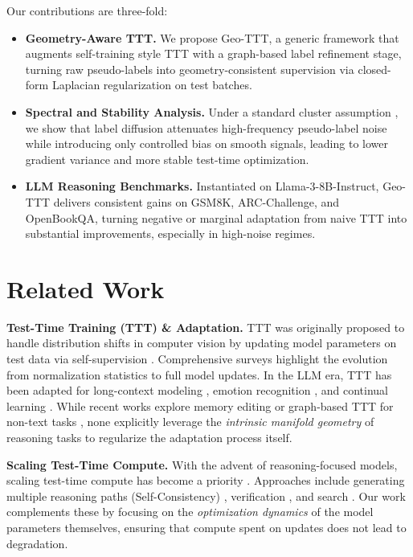 \documentclass{article}
\theoremstyle{plain}
\theoremstyle{definition}
\theoremstyle{remark}
\begin{document}
Our contributions are three-fold:
\begin{itemize}
    \item \textbf{Geometry-Aware TTT.} We propose Geo-TTT, a generic framework that augments self-training style TTT with a graph-based label refinement stage, turning raw pseudo-labels into geometry-consistent supervision via closed-form Laplacian regularization on test batches.
    \item \textbf{Spectral and Stability Analysis.} Under a standard cluster assumption \cite{chapelle2005manifold, belkin2006manifoldreg}, we show that label diffusion attenuates high-frequency pseudo-label noise while introducing only controlled bias on smooth signals, leading to lower gradient variance and more stable test-time optimization.
    \item \textbf{LLM Reasoning Benchmarks.} Instantiated on Llama-3-8B-Instruct, Geo-TTT delivers consistent gains on GSM8K, ARC-Challenge, and OpenBookQA, turning negative or marginal adaptation from naive TTT into substantial improvements, especially in high-noise regimes.
\end{itemize}


\section{Related Work}

\textbf{Test-Time Training (TTT) \& Adaptation.} 
TTT was originally proposed to handle distribution shifts in computer vision by updating model parameters on test data via self-supervision \cite{sun2020ttt, wang2021tent, mummadi2021tta}. Comprehensive surveys \cite{zhang2024surveytta, wang2023otta, xiao2024beyond} highlight the evolution from normalization statistics to full model updates. In the LLM era, TTT has been adapted for long-context modeling \cite{sun2023learning, templora2024}, emotion recognition \cite{templora2025emotion}, and continual learning \cite{tlm2025, inplacettt2025}. While recent works explore memory editing \cite{xie2025memoryttt} or graph-based TTT for non-text tasks \cite{llmttt2024mm}, none explicitly leverage the \textit{intrinsic manifold geometry} of reasoning tasks to regularize the adaptation process itself.

\textbf{Scaling Test-Time Compute.}
With the advent of reasoning-focused models, scaling test-time compute has become a priority \cite{snell2024scaling, ttcsurvey2025}. Approaches include generating multiple reasoning paths (Self-Consistency) \cite{selfconsistency2022}, verification \cite{lightman2024let}, and search \cite{yang2025search}. Our work complements these by focusing on the \textit{optimization dynamics} of the model parameters themselves, ensuring that compute spent on updates does not lead to degradation.
\end{document}
